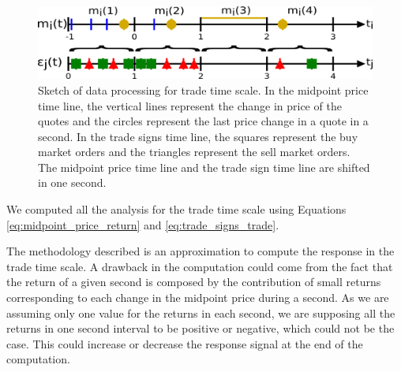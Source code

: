 \begin{figure}[htbp]
    \centering
    \includegraphics[width=\columnwidth]
    {figures/02_relation_trades_quotes_trade_scale.png}
    \caption{Sketch of data processing for trade time scale. In the midpoint
             price time line, the vertical lines represent the change in price
             of the quotes and the circles represent the last price change in a
             quote in a second. In the trade signs time line, the squares
             represent the buy market orders and the triangles represent the
             sell market orders. The midpoint price time line and the trade
             sign time line are shifted in one second.}
    \label{fig:relation_trades_midpoint_trade_scale}
\end{figure}

We computed all the analysis for the trade time scale using Equations
\ref{eq:midpoint_price_return} and \ref{eq:trade_signs_trade}.

The methodology described is an approximation to compute the response in the
trade time scale. A drawback in the computation could come from the fact that
the return of a given second is composed by the contribution of small returns
corresponding to each change in the midpoint price during a second. As we are
assuming only one value for the returns in each second, we are supposing  all
the returns in one second interval to be positive or negative, which could not
be the case. This could increase or decrease the response signal at the end of
the computation.

